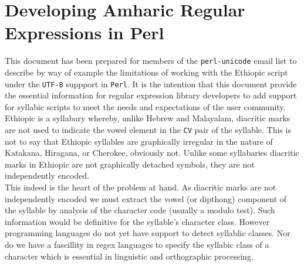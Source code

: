 
\section*{Developing Amharic Regular Expressions in Perl}
\centerline{\large\textbf{\textit{{\beG}{\daG}{\nG}{\EG}{\lG}{\spaceG}{\yaG}{\IIG}{\qoG}{\bG}}}}
\vspace*{0.4in}





\noi
This document has been prepared for members of the \texttt{perl-unicode} email
list to describe by way of example the limitations of working with the Ethiopic
script under the \texttt{UTF-8} suppport in \texttt{Perl}.  It is the intention
that this document provide the essential information for regular expression 
library developers to add support for syllabic scripts to meet the needs and
expectations of the user community.\\


\noi
Ethiopic is a syllabary whereby, unlike Hebrew and Malayalam, diacritic marks
are not used to indicate the vowel element in the \texttt{CV} pair of the
syllable.  This is not to say that Ethiopic syllables are graphically irregular
in the nature of Katakana, Hiragana, or Cherokee, obviously not.  Unlike some
syllabaries diacritic marks in Ethiopic are not graphically detached symbols,
they are not independently encoded.\\

\noi
This indeed is the heart of the problem at hand.  As diacritic marks are not
independently encoded we must extract the vowel (or dipthong) component
of the syllable by analysis of the character code (usually a modulo test).
Such information would be definitive for the syllable's character class.
However programming languages do not yet have support to detect syllablic
classes.  Nor do we have a fascillity in regex languages to specify the
syllabic class of a character which is essential in linguistic and orthographic
processing.\\

